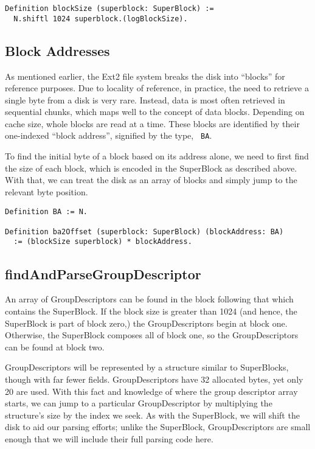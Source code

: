 \documentclass[nocopyrightspace,preprint]{sigplanconf}
\begin{document}
\begin{lstlisting}
Definition blockSize (superblock: SuperBlock) := 
  N.shiftl 1024 superblock.(logBlockSize).
\end{lstlisting}

\subsection{Block Addresses}

As mentioned earlier, the Ext2 file system breaks the disk into ``blocks'' for
reference purposes. Due to locality of reference, in practice, the need to
retrieve a single byte from a disk is very rare. Instead, data is most often
retrieved in sequential chunks, which maps well to the concept of data blocks.
Depending on cache size, whole blocks are read at a time. These blocks are
identified by their one-indexed ``block address'', signified by the type, {\tt
BA}. 

To find the initial byte of a block based on its address alone, we need to
first find the size of each block, which is encoded in the SuperBlock as
described above. With that, we can treat the disk as an array of blocks and
simply jump to the relevant byte position.

\begin{lstlisting}
Definition BA := N.

Definition ba2Offset (superblock: SuperBlock) (blockAddress: BA)
  := (blockSize superblock) * blockAddress.
\end{lstlisting}

\subsection{findAndParseGroupDescriptor}
An array of GroupDescriptors can be found in the block following that which
contains the SuperBlock. If the block size is greater than 1024 (and hence,
the SuperBlock is part of block zero,) the GroupDescriptors begin at block
one. Otherwise, the SuperBlock composes all of block one, so the
GroupDescriptors can be found at block two.

GroupDescriptors will be represented by a structure similar to SuperBlocks,
though with far fewer fields. GroupDescriptors have 32 allocated bytes, yet
only 20 are used. With this fact and knowledge of where the group descriptor
array starts, we can jump to a particular GroupDescriptor by multiplying the
structure's size by the index we seek. As with the SuperBlock, we will shift
the disk to aid our parsing efforts; unlike the SuperBlock, GroupDescriptors
are small enough that we will include their full parsing code here.
\end{document}
